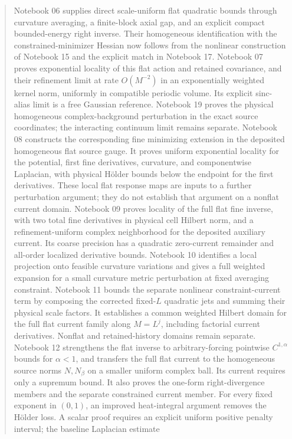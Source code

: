 \documentclass[11pt]{article}
\theoremstyle{remark}
\begin{document}
\begin{abstract}
Notebook 06 supplies direct scale-uniform flat quadratic bounds through
curvature averaging, a finite-block axial gap, and an explicit compact
bounded-energy right inverse. Their homogeneous identification with the
constrained-minimizer Hessian now follows from the nonlinear construction
of Notebook 15 and the explicit match in Notebook 17.
Notebook 07 proves exponential locality of this flat
action and retained covariance, and their refinement limit at rate
$O(M^{-2})$ in an exponentially weighted kernel norm, uniformly in
compatible periodic volume. Its explicit sinc-alias limit is a free
Gaussian reference. Notebook 19 proves the physical homogeneous
complex-background perturbation in the exact source coordinates;
the interacting continuum limit remains separate.
Notebook 08 constructs the corresponding fine minimizing extension
in the deposited homogeneous flat source gauge. It proves uniform
exponential locality for the potential, first fine derivatives,
curvature, and componentwise Laplacian, with physical H\"older
bounds below the endpoint for the first derivatives. These local
flat response maps are inputs to a further perturbation argument;
they do not establish that argument on a nonflat current domain.
Notebook 09 proves locality of the full flat fine inverse, with
two total fine derivatives in physical cell Hilbert norm, and a
refinement-uniform complex neighborhood for the deposited auxiliary
current. Its coarse precision has a quadratic zero-current remainder
and all-order localized derivative bounds.
Notebook 10 identifies a local projection onto feasible curvature
variations and gives a full weighted expansion for a small curvature
metric perturbation at fixed averaging constraint.
Notebook 11 bounds the separate nonlinear constraint-current term by
composing the corrected fixed-$L$ quadratic jets and summing their
physical scale factors. It establishes a common weighted Hilbert
domain for the full flat current family along $M=L^j$, including
factorial current derivatives. Nonflat and retained-history domains
remain separate.
Notebook 12 strengthens the flat inverse to arbitrary-forcing
pointwise $C^{1,\alpha}$ bounds for $\alpha<1$, and transfers the
full flat current to the homogeneous source norms $N,N_\beta$
on a smaller uniform complex ball. Its current requires only a
supremum bound. It also proves the one-form right-divergence
members and the separate constrained current member. For every
fixed exponent in $(0,1)$, an improved heat-integral argument
removes the H\"older loss. A scalar proof requires an explicit
uniform positive penalty interval; the baseline Laplacian estimate

\end{abstract}
\end{document}
